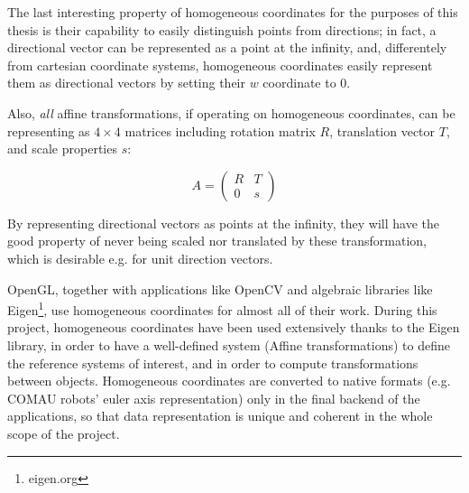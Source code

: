 The last interesting property of homogeneous coordinates for the purposes of
this thesis is their capability to easily distinguish points from directions;
in fact, a directional vector can be represented as a point at the infinity,
and, differentely from cartesian coordinate systems, homogeneous coordinates
easily represent them as directional vectors by setting their $w$ coordinate to
$0$.

Also, \emph{all} affine transformations, if operating on homogeneous
coordinates, can be representing as $4\times 4$ matrices including rotation
matrix $R$, translation vector $T$, and scale properties $s$:

\begin{equation}
  A=\begin{pmatrix}
    R & T \\
    0 & s
  \end{pmatrix}
\end{equation}

By representing directional vectors as points at the infinity, they will have
the good property of never being scaled nor translated by these transformation,
which is desirable e.g. for unit direction vectors.

OpenGL, together with applications like OpenCV and algebraic libraries like
Eigen\footnote{eigen.org}, use homogeneous coordinates for almost all of their
work. During this project, homogeneous coordinates have been used extensively
thanks to the Eigen library, in order to have a well-defined system (Affine
transformations) to define the reference systems of interest, and in order to
compute transformations between objects. Homogeneous coordinates are converted
to native formats (e.g. COMAU robots' euler axis representation) only in the
final backend of the applications, so that data representation is unique and
coherent in the whole scope of the project.

